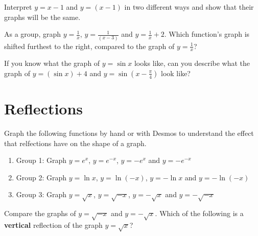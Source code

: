 \documentclass[number]{ximera}
\begin{document}
\begin{question}
Interpret $y = x-1$ and $y = (x-1)$ in two different ways and show that their graphs will be the same.
\begin{freeResponse}\end{freeResponse}
\end{question}

\begin{problem}
As a group, graph $y = \displaystyle{\frac{1}{x}}$, $y = \displaystyle{\frac{1}{(x-3)}}$ and $y = \displaystyle{\frac{1}{x} + 2}$. Which function's graph is shifted furthest to the right, compared to the graph of $y=\frac{1}{x}$?
\begin{multipleChoice}
\end{multipleChoice}
\end{problem}

\begin{question}
If you know what the graph of $y = \sin x$ looks like, can you describe what the graph of $y = (\sin x) + 4$ and $y = \sin (x-\frac{\pi}{4})$ look like?
\begin{freeResponse}\end{freeResponse}
\end{question}

\section{Reflections}

\begin{problem}
Graph the following functions by hand or with Desmos to understand the effect that relfections have on the shape of a graph.
\begin{enumerate}
\item Group 1: Graph $y = e^x$, $y = e^{-x}$, $y=-e^x$ and $y = -e^{-x}$
\item Group 2: Graph $y = \ln x$, $y = \ln (-x)$, $y = - \ln x$ and $y = - \ln (-x)$
\item Group 3: Graph $y = \sqrt x$, $y = \sqrt {-x}$, $y = - \sqrt x$ and $y = - \sqrt {-x}$
\end{enumerate}
\end{problem}

\begin{question}
Compare the graphs of $y=\sqrt{-x}$ and $y=-\sqrt{x}$. Which of the following is a {\bf vertical} reflection of the graph $y=\sqrt{x}$?
\begin{multipleChoice}
\end{multipleChoice}
\end{question}
\end{document}
